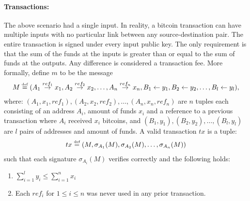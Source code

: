 \documentclass[]{report}   %
\newcommand{\sr}{\stackrel}
\newcommand{\ra}{\rightarrow}
\newcommand{\la}{\leftarrow}
\newcommand{\defined}{\stackrel{\mbox{\tiny{def}}}{=}}
\begin{document}
 
 
\paragraph{Transactions:} The above scenario had a single input. In reality, 
a bitcoin transaction can have multiple inputs with no particular link between any source-destination pair. The entire transaction is signed under every input public key. The only requirement is that the sum of the funds at the inputs is greater than or equal to the sum of funds at the outputs. Any difference is considered a transaction fee. More formally, define $m$ to be the message
\[
M \defined (A_1\sr{ref_1}{\ra}x_1, A_2\sr{ref_2}{\ra}x_2, \ldots, A_n\sr{ref_n}{\ra}x_n, B_1\la y_1,
B_2\la y_2, \ldots, B_l\la y_l), 
\] 
where: $(A_1, x_1, ref_1), (A_2, x_2, ref_2),\ldots , (A_n, x_n, ref_n)$ are $n$ tuples each consisting of an address $A_i$, amount of funds $x_i$ and a reference to a previous transaction %
where $A_i$ received $x_i$ bitcoins, and $(B_1, y_1), (B_2, y_2),\ldots, (B_l, y_l)$ are $l$ pairs of addresses and amount of funds. 
A valid transaction $tx$ is a tuple: 
\begin{equation}\label{tx0}tx\defined (M, \sigma_{A_1}(M), \sigma_{A_2}(M), \ldots, \sigma_{A_n}(M))\end{equation} such that each signature $\sigma_{A_i}(M)$ verifies correctly and the following holds:
\begin{enumerate}
	\item $\sum_{i=1}^{l}y_i \leq \sum_{i=1}^{n}x_i$ 
	\item Each $ref_i$ for $1\leq i\leq n$ was never used in any prior transaction.
\end{enumerate}
\end{document}

